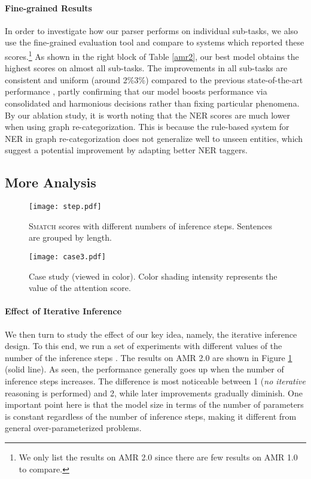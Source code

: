 \documentclass[11pt,a4paper]{article}
\begin{document}
	\paragraph{Fine-grained Results} In order to investigate how our parser performs on individual sub-tasks, we also use the fine-grained evaluation tool \cite{damonte2016incremental} and compare to systems which reported these scores.\footnote{We only list the results on AMR 2.0 since there are few results on AMR 1.0 to compare.} As shown in the right block of Table \ref{amr2}, our best model obtains the highest scores on almost all sub-tasks. The improvements in all sub-tasks are consistent and uniform (around 2\%3\%) compared to the previous state-of-the-art performance \cite{zhang-etal-2019-broad}, partly confirming that our model boosts performance via consolidated and harmonious decisions rather than fixing particular phenomena. By our ablation study, it is worth noting that the NER scores are much lower when using graph re-categorization. This is because the rule-based system for NER in graph re-categorization does not generalize well to unseen entities, which suggest a potential improvement by adapting better NER taggers.
	\subsection{More Analysis}
		\begin{figure}[t]
		\centering
		\texttt{[image: step.pdf]}
		\caption{\textsc{Smatch} scores with different numbers of inference steps. Sentences are grouped by length.}
		\label{step}
	\end{figure}
	\begin{figure*}[t]
		\centering
		\texttt{[image: case3.pdf]}
		\caption{Case study (viewed in color). Color shading intensity represents the value of the attention score.}
		\label{case}
	\end{figure*}
	\paragraph{Effect of Iterative Inference}
	We then turn to study the effect of our key idea, namely, the iterative inference design. To this end, we run a set of experiments with different values of the number of the inference steps . The results on AMR 2.0 are shown in Figure \ref{step} (solid line). As seen, the performance generally goes up when the number of inference steps increases. The difference is most noticeable between 1 (\textit{no iterative} reasoning is performed) and 2, while later improvements gradually diminish. One important point here is that the model size in terms of the number of parameters is constant regardless of the number of inference steps, making it different from general over-parameterized problems.
	
\end{document}
